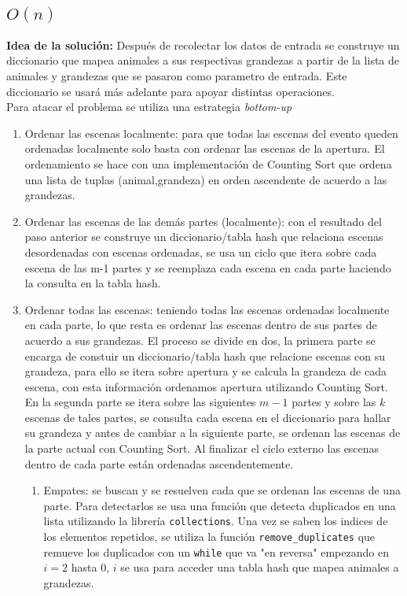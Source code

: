 \documentclass{article}
\begin{document}
		\subsection{$O(n)$}
			\textbf{Idea de la solución:} Después de recolectar los datos de entrada se construye un diccionario que mapea 
			animales a sus respectivas grandezas a partir de la lista de animales y grandezas que se pasaron como parametro de
			entrada. Este diccionario se usará más adelante para apoyar distintas operaciones.\\
			Para atacar el problema se utiliza una estrategia \textit{bottom-up} 
			\begin{enumerate}
				\item Ordenar las escenas localmente: para que todas las escenas del evento queden ordenadas localmente solo basta con ordenar
					las escenas de la apertura. El ordenamiento se hace con una implementación de Counting Sort que ordena una lista de 
					tuplas (animal,grandeza) en orden ascendente de acuerdo a las grandezas. 
				\item Ordenar las escenas de las demás partes (localmente): con el resultado del paso anterior se construye un diccionario/tabla hash
					que relaciona escenas desordenadas con escenas ordenadas, se usa un ciclo que itera sobre cada escena de las m-1
					partes y se reemplaza cada escena en cada parte haciendo la consulta en la tabla hash.
				\item Ordenar todas las escenas: teniendo todas las escenas ordenadas localmente en cada parte, lo que resta es ordenar las escenas
					dentro de sus partes de acuerdo a sus grandezas. El proceso se divide en dos, la primera parte
					se encarga de constuir un diccionario/tabla hash que relacione escenas con su grandeza, para ello se itera sobre 
					apertura y se calcula la grandeza de cada escena, con esta información ordenamos apertura utilizando Counting Sort.\\
					En la segunda parte se itera sobre las siguientes $m-1$ partes y sobre las $k$ escenas de tales partes, se consulta cada escena
					en el diccionario para hallar su grandeza y antes de cambiar a la siguiente parte, se ordenan las escenas de la parte actual
					con Counting Sort. Al finalizar el ciclo externo las escenas dentro de cada parte están ordenadas ascendentemente.

					\begin{enumerate}
						\item Empates: se buscan y se resuelven cada que se ordenan las escenas de una parte. Para detectarlos se usa una función
							que detecta duplicados en una lista utilizando la librería \texttt{collections}. Una vez se saben los indices de los 
							elementos repetidos, se utiliza la función \texttt{remove\_duplicates} que remueve los duplicados con un \texttt{while}
							que va "en reversa" empezando en $i=2$ hasta $0$, $i$ se usa para acceder una tabla hash que mapea animales a grandezas.


\end{enumerate}
\end{enumerate}
\end{document}
